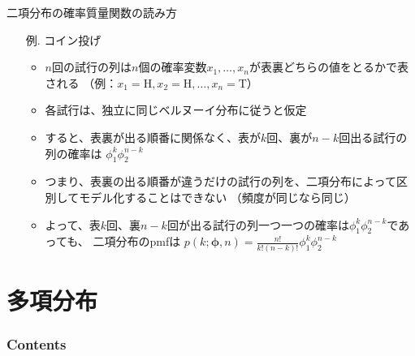 \documentclass[aspectratio=169,unicode,dvipdfmx,14pt]{beamer}
\begin{document}
\begin{frame}{二項分布の確率質量関数の読み方}
\begin{itemize}
\item[例.] コイン投げ
\begin{itemize}
\item $n$回の試行の列は$n$個の確率変数$x_1,\ldots,x_n$が表裏どちらの値をとるかで表される
（例：$x_1=\mbox{H},x_2=\mbox{H},\ldots,x_n=\mbox{T}$）
\item 各試行は、独立に同じベルヌーイ分布に従うと仮定
\item すると、表裏が出る順番に関係なく、表が$k$回、裏が$n-k$回出る試行の列の確率は
$\phi_1^k \phi_2^{n-k}$
\item つまり、表裏の出る順番が違うだけの試行の列を、二項分布によって区別してモデル化することはできない
（頻度が同じなら同じ）
\item よって、表$k$回、裏$n-k$回が出る試行の列一つ一つの確率は$\phi_1^k \phi_2^{n-k}$であっても、
二項分布のpmfは
$p(k;\bm{\phi},n)=\frac{n!}{k!(n-k)!}\phi_1^k\phi_2^{n-k}$
\end{itemize}
\end{itemize}
\end{frame}


\section{多項分布}

\begin{frame}\frametitle{Contents}
\Large \tableofcontents[currentsection]
\end{frame}
\end{document}
